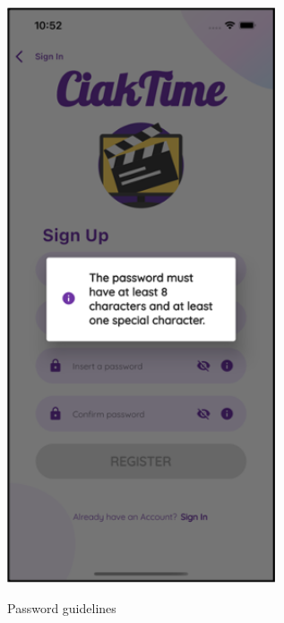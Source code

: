 \documentclass[12pt, a4paper]{article}
\numberwithin{figure}{section}
\begin{document}
\begin{center}
\begin{minipage}[t]{0.31\textwidth}
\begin{figure}[H]
			\includegraphics[width=0.71\textwidth]{images/prototype2/infoPass.png}\\
			\caption{Password guidelines}
		\end{figure}
	\end{minipage}
	\hspace{0.015\linewidth}
	\begin{minipage}[t]{0.31\textwidth}
		\begin{figure}[H]
			\centering

\end{figure}
\end{minipage}
\end{center}
\end{document}
